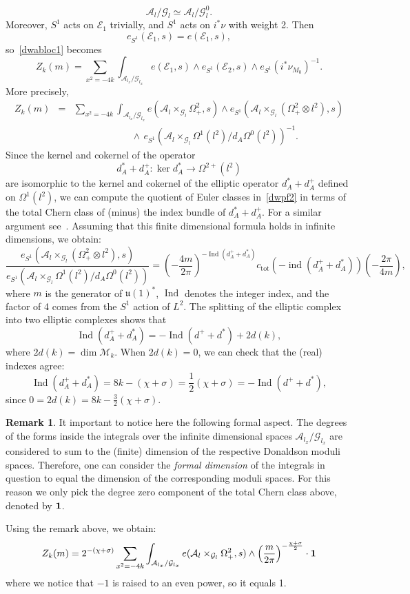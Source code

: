 \documentclass[a4paper,12pt,reqno,sumlimits]{amsart}
\theoremstyle{plain}
\theoremstyle{definition}
\newtheorem{rem}[thm]{Remark}
\newcommand{\1}{{\bf 1}}
\newcommand{\uu}{{\mathfrak  u}}
\newcommand{\calA}{{\mathcal A}}
\newcommand{\calE}{{\mathcal E}}
\newcommand{\calG}{{\mathcal G}}
\newcommand{\calM}{{\mathcal M}}
\renewcommand{\to}{\longrightarrow}
\newcommand{\ind}{{\operatorname{ind}}}
\newcommand{\Ind}{{\operatorname{Ind}}}
\newcommand{\inv}{^{-1}}
\numberwithin{equation}{section}
\begin{document}
$$
\calA_l/\calG_l\simeq\calA_l/\calG_l^0.
$$
Moreover, $S^1$ acts on $\calE_1$ trivially, and $S^1$ acts on $i^*\nu$ with
weight 2. Then
$$
e_{S^1}(\calE_1,s)=e(\calE_1,s),
$$
so~\eqref{dwabloc1} becomes
$$
Z_k(m)=\sum_{x^2=-4k}\int_{\calA_{l_x}/\calG_{l_x}}
e(\calE_1,s)\wedge e_{S^1}(\calE_2,s)\wedge
e_{S^1}(i^*\nu_{M_0})\inv.
$$
More precisely,
\begin{eqnarray}
  \label{dwpf2}
  Z_k(m)&=&\sum_{x^2=-4k}\int_{\calA_{l_x}/\calG_{l_x}}
  e(\calA_l\times_{\calG_l}\Omega^2_+,s)\wedge 
  e_{S^1}(\calA_l\times_{\calG_l}(\Omega^2_+\otimes l^2),s)\nonumber\\
  &&\qquad\qquad\qquad\wedge\, 
  e_{S^1}(\calA_l\times_{\calG_l}\Omega^1(l^2)/d_A\Omega^0(l^2))\inv.
\end{eqnarray}
Since the kernel and cokernel of the operator
$$
d_A^* + d_A^+ :\ker{d_A^*}\to\Omega^{2+}(l^2)
$$
are isomorphic to the kernel and cokernel of the elliptic operator
$d_A^*+d_A^+$ defined on $\Omega^1(l^2)$, we can compute the quotient of
Euler classes in~\eqref{dwpf2} in terms of the total Chern class of (minus)
the index bundle of $d_A^*+d_A^+$. For a similar argument see~\cite[Prop
4.4]{radu}.  Assuming that this finite dimensional formula holds in infinite
dimensions, we obtain:
\begin{equation*}
  \frac{e_{S^1}(\calA_l\times_{\calG_l}(\Omega^2_+\otimes l^2),s)}
  {e_{S^1}(\calA_l\times_{\calG_l}\Omega^1(l^2)/d_A\Omega^0(l^2))}=
  \left(-\frac{4m}{2\pi}\right)^{-\Ind(d_A^++d_A^*)}
  c_{\text{tot}}\left(-\ind(d_A^++d_A^*)\right)\left(-\frac{2\pi}{4m}\right),
\end{equation*}
where $m$ is the generator of $\uu(1)^*$, $\Ind$ denotes the integer
index, and the factor of 4 comes from the $S^1$ action of $L^2$.  The
splitting of the elliptic complex into two elliptic complexes shows that
$$
\Ind(d_A^++d_A^*)=-\Ind(d^++d^*)+2d(k),
$$
where $2d(k)=\dim\calM_k$. When $2d(k)=0$, we can check that the (real)
indexes agree:
$$
\Ind(d_A^++d_A^*)=8k-(\chi+\sigma)=\frac{1}{2}(\chi+\sigma)=-\Ind(d^++d^*),
$$
since $0=2d(k)=8k-\frac{3}{2}(\chi+\sigma)$. 

\begin{rem}
  \label{dimaspect}
  It important to notice here the following formal aspect. The degrees of the
  forms inside the integrals over the infinite dimensional spaces
  $\calA_{l_x}/\calG_{l_x}$ are considered to sum to the (finite) dimension
  of the respective Donaldson moduli spaces. Therefore, one can consider the
  {\em formal dimension} of the integrals in question to equal the dimension
  of the corresponding moduli spaces. For this reason we only pick the degree
  zero component of the total Chern class above, denoted by $\1$.
\end{rem}
Using the remark above, we obtain:
\begin{equation}
  \label{dwabloc2}
  Z_k(m)=2^{-(\chi+\sigma)}\sum_{x^2=-4k}\int_{\calA_{l_x}/\calG_{l_x}}
  e(\calA_l\times_{\calG_l}\Omega^2_+,s)\wedge 
  \left(\frac{m}{2\pi}\right)^{-\frac{\chi+\sigma}{2}}\cdot\1
\end{equation}
where we notice that $-1$ is raised to an even power, so it equals 1.
\end{document}
